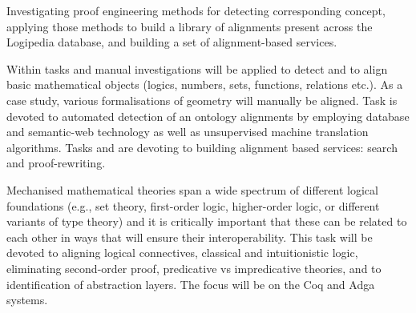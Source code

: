 \begin{workpackage}[id=alignment,type=RTD,wphases=1-48,
  short={Proof engineering},%
  title={Proof engineering},
  activity=jra,
  lead=Bel,
  LeeRM=17,  %
  StrRM=25,  %
  BelRM=20,  %
  ImtRM=11,  %
  InnRM=8,  %
  SacRM=9,  %
  FauRM=11, %
  BolRM=14, %
  InrRM=8,  %
  LmuRM=1   %
  ]

  \begin{wpobjectives}
    Investigating proof engineering
    methods for detecting corresponding concept, applying those methods
    to build a library of alignments present across the Logipedia
    database, and building a set of alignment-based services.
  \end{wpobjectives}

  \begin{wpdescription}
    Within tasks  and
     manual investigations will be
    applied to detect and to align basic mathematical objects (logics,
    numbers, sets, functions, relations etc.). As a case study,
    various formalisations of geometry will manually be aligned. Task
     is devoted to automated detection of
    an ontology alignments by employing database and semantic-web
    technology as well as unsupervised machine translation algorithms.
    Tasks  and 
    are devoting to building alignment based services: search and
    proof-rewriting.
  \end{wpdescription}

\begin{tasklist}
  \begin{task}[id=alignlogic,title=Logical foundations,shorttitle=Found.,lead=Lee,LeeRM=17,InrRM=3,LmuRM=1,wphases=6-24!.67]
    Mechanised mathematical theories span a wide spectrum of different
    logical foundations (e.g., set theory, first-order logic,
    higher-order logic, or different variants of type theory) and it
    is critically important that these can be related to each other in
    ways that will ensure their interoperability. This task will be
    devoted to aligning logical connectives, classical and
    intuitionistic logic, eliminating second-order proof, predicative
    vs impredicative theories, and to identification of abstraction
    layers. The focus will be on the Coq and Adga systems.
  \end{task}
  

\end{tasklist}
\end{workpackage}
